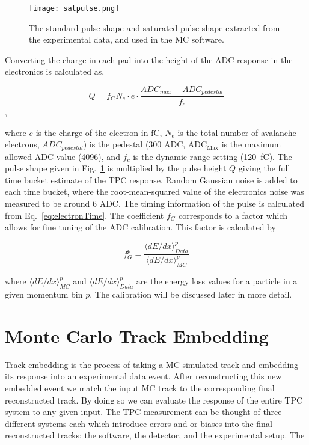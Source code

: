 \begin{figure}[!htb]
    \centering       
    \texttt{[image: satpulse.png]} 
    \caption{The standard pulse shape and saturated pulse shape extracted from the experimental data, and used in the MC software.}
    \label{fig:pulseshape}
\end{figure}


Converting the charge in each pad into the height of the ADC response in the electronics is calculated as, 

\begin{equation}
Q = f_G  N_{e}  \cdot e \cdot\frac{ADC_{max} - ADC_{pedestal}}{f_c}
\label{eq:etoADC}
\end{equation},

where $e$ is the charge of the electron in $\si{\femto \coulomb}$, $N_{e}$ is the total number of avalanche electrons, $ADC_{pedestal}$) is the pedestal (300 ADC, $\mathrm{ADC_{Max}}$ is the maximum allowed ADC value (4096), and $f_c$ is the dynamic range setting (\SI{120}{\femto\coulomb}). The pulse shape given in Fig.~\ref{fig:pulseshape} is multiplied by the pulse height $Q$ giving the full time bucket estimate of the TPC response. Random Gaussian noise is added to each time bucket, where the root-mean-squared value of the electronics noise was measured to be around 6 ADC. The timing information of the pulse is calculated from Eq.~\ref{eq:electronTime}. The coefficient $f_G$ corresponds to a factor which allows for fine tuning of the ADC calibration. This factor is calculated by

\begin{equation}
f_G^p = \frac{\langle dE/dx\rangle_{Data}^p}{\langle dE/dx\rangle_{MC}^p}
\label{eq:dedxcalibration}
\end{equation}

where $\langle dE/dx\rangle_{MC}^p$ and $\langle dE/dx\rangle_{Data}^p$  are the energy loss values for a particle in a given momentum bin $p$. The calibration will be discussed later in more detail. 


\section{Monte Carlo Track Embedding}
\label{sec:embedding}
Track embedding is the process of taking a MC simulated track and embedding its response into an experimental data event. After reconstructing this new embedded event we match the input MC track to the corresponding final reconstructed track.  By doing so we can evaluate the response of the entire TPC system to any given input. The TPC measurement can be thought of three different systems each which introduce errors and or biases into the final reconstructed tracks; the software, the detector, and the experimental setup. The 

